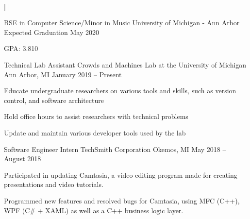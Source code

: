\documentclass[]{awesome-cv}
\begin{document}
    
\begin{center}
	  \\

	{} | {} | {}
\end{center}
\vspace{-4mm}
\vspace{-2mm}
\cventry
	{BSE in Computer Science/Minor in Music}
	{University of Michigan - Ann Arbor}
	{}
	{Expected Graduation May 2020}
	{\begin{cvitems}
		\item{GPA: 3.810}
		\end{cvitems}}

\vspace{-5mm}
\vspace{-2mm}

	\cventry
	{Technical Lab Assistant}
	{Crowds and Machines Lab at the University of Michigan}
	{Ann Arbor, MI}
	{January 2019 – Present}
	{\begin{cvitems}
		\item {Educate undergraduate researchers on various tools and skills, such as version control, and software architecture}
		\item {Hold office hours to assist researchers with technical problems}
		\item {Update and maintain various developer tools used by the lab}
		\end{cvitems}}

	\vspace{-4mm}
	\cventry
	{Software Engineer Intern}
	{TechSmith Corporation}
	{Okemos, MI}
	{May 2018 – August 2018}
	{\begin{cvitems}
		\item {Participated in updating Camtasia, a video editing program made for creating presentations and video tutorials.}
		\item {Programmed new features and resolved bugs for Camtasia, using MFC (C++), WPF (C\# + XAML) as well as a C++ business logic layer.}
		\end{cvitems}}
\end{document}
